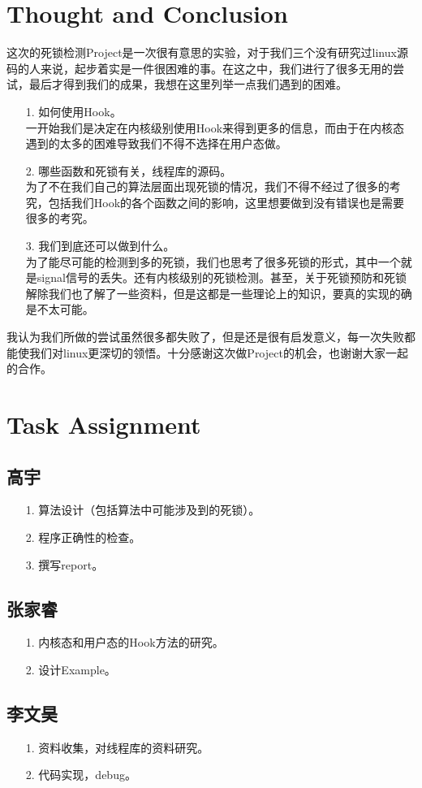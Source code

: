 \documentclass[titlepage]{article}
\begin{document}
\section{Thought and Conclusion}
\indent 这次的死锁检测Project是一次很有意思的实验，对于我们三个没有研究过linux源码的人来说，起步着实是一件很困难的事。在这之中，我们进行了很多无用的尝试，最后才得到我们的成果，我想在这里列举一点我们遇到的困难。
\begin{itemize}
	\item[1.] 如何使用Hook。\\
一开始我们是决定在内核级别使用Hook来得到更多的信息，而由于在内核态遇到的太多的困难导致我们不得不选择在用户态做。
	\item[2.] 哪些函数和死锁有关，线程库的源码。\\
为了不在我们自己的算法层面出现死锁的情况，我们不得不经过了很多的考究，包括我们Hook的各个函数之间的影响，这里想要做到没有错误也是需要很多的考究。
	\item[3.] 我们到底还可以做到什么。\\
为了能尽可能的检测到多的死锁，我们也思考了很多死锁的形式，其中一个就是signal信号的丢失。还有内核级别的死锁检测。甚至，关于死锁预防和死锁解除我们也了解了一些资料，但是这都是一些理论上的知识，要真的实现的确是不太可能。
\end{itemize}
\indent 我认为我们所做的尝试虽然很多都失败了，但是还是很有启发意义，每一次失败都能使我们对linux更深切的领悟。十分感谢这次做Project的机会，也谢谢大家一起的合作。


\section{Task Assignment}

\subsection{高宇}
\begin{itemize}
	\item[1.] 算法设计（包括算法中可能涉及到的死锁）。
	\item[2.] 程序正确性的检查。
	\item[3.] 撰写report。
\end{itemize}

\subsection{张家睿}
\begin{itemize}
	\item[1.] 内核态和用户态的Hook方法的研究。
	\item[2.] 设计Example。
\end{itemize}

\subsection{李文昊}
\begin{itemize}
	\item[1.] 资料收集，对线程库的资料研究。
	\item[2.] 代码实现，debug。
\end{itemize}
\end{document}
